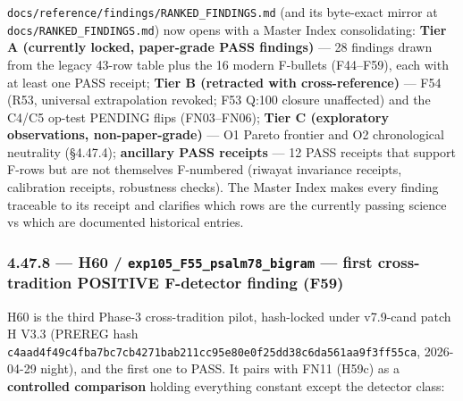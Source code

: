 \documentclass[
]{article}
\begin{document}
\texttt{docs/reference/findings/RANKED\_FINDINGS.md} (and its byte-exact
mirror at \texttt{docs/RANKED\_FINDINGS.md}) now opens with a Master
Index consolidating: \textbf{Tier A (currently locked, paper-grade PASS
findings)} --- 28 findings drawn from the legacy 43-row table plus the
16 modern F-bullets (F44--F59), each with at least one PASS receipt;
\textbf{Tier B (retracted with cross-reference)} --- F54 (R53, universal
extrapolation revoked; F53 Q:100 closure unaffected) and the C4/C5
op-test PENDING flips (FN03--FN06); \textbf{Tier C (exploratory
observations, non-paper-grade)} --- O1 Pareto frontier and O2
chronological neutrality (§4.47.4); \textbf{ancillary PASS receipts} ---
12 PASS receipts that support F-rows but are not themselves F-numbered
(riwayat invariance receipts, calibration receipts, robustness checks).
The Master Index makes every finding traceable to its receipt and
clarifies which rows are the currently passing science vs which are
documented historical entries.

\subsubsection{\texorpdfstring{4.47.8 --- H60 /
\texttt{exp105\_F55\_psalm78\_bigram} --- first cross-tradition POSITIVE
F-detector finding
(F59)}{4.47.8 --- H60 / exp105\_F55\_psalm78\_bigram --- first cross-tradition POSITIVE F-detector finding (F59)}}\label{h60-exp105_f55_psalm78_bigram-first-cross-tradition-positive-f-detector-finding-f59}

H60 is the third Phase-3 cross-tradition pilot, hash-locked under
v7.9-cand patch H V3.3 (PREREG hash
\texttt{c4aad4f49c4fba7bc7cb4271bab211cc95e80e0f25dd38c6da561aa9f3ff55ca},
2026-04-29 night), and the first one to PASS. It pairs with FN11 (H59c)
as a \textbf{controlled comparison} holding everything constant except
the detector class:
\end{document}
